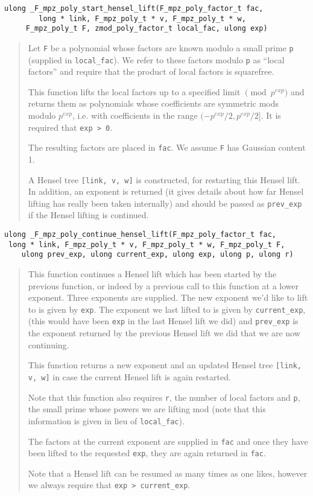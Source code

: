 \documentclass[a4paper,10pt]{article}
\newcommand{\code}{\lstinline}
\begin{document}
\begin{lstlisting}
ulong _F_mpz_poly_start_hensel_lift(F_mpz_poly_factor_t fac, 
        long * link, F_mpz_poly_t * v, F_mpz_poly_t * w, 
     F_mpz_poly_t F, zmod_poly_factor_t local_fac, ulong exp)
\end{lstlisting}
\begin{quote}
Let \code{F} be a polynomial whose factors are known modulo a small prime \code{p} (supplied in 
\code{local_fac}). We refer to these factors modulo \code{p} as ``local factors'' and require that the 
product of local factors is squarefree. 

This function lifts the local factors up to a specified limit $\pmod{p^{exp}}$ and returns them as 
polynomials whose coefficients are symmetric mods modulo $p^{exp}$, i.e. with coefficients in the range 
$(-p^{exp}/2, p^{exp}/2]$. It is required that \code{exp > 0}.

The resulting factors are placed in \code{fac}. We assume \code{F} has Gaussian content 1.

A Hensel tree \code{[link, v, w]} is constructed, for restarting this Hensel lift. In addition, an
exponent is returned (it gives details about how far Hensel lifting has really been taken internally)
and should be passed as \code{prev_exp} if the Hensel lifting is continued.
\end{quote}

\begin{lstlisting}
ulong _F_mpz_poly_continue_hensel_lift(F_mpz_poly_factor_t fac, 
 long * link, F_mpz_poly_t * v, F_mpz_poly_t * w, F_mpz_poly_t F, 
    ulong prev_exp, ulong current_exp, ulong exp, ulong p, ulong r)
\end{lstlisting}
\begin{quote}
This function continues a Hensel lift which has been started by the previous function, or indeed by a
previous call to this function at a lower exponent. Three exponents are supplied. The new exponent we'd
like to lift to is given by \code{exp}. The exponent we last lifted to is given by \code{current_exp},
(this would have been \code{exp} in the last Hensel lift we did) and \code{prev_exp} is the exponent
returned by the previous Hensel lift we did that we are now continuing.

This function returns a new exponent and an updated Hensel tree \code{[link, v, w]} in case the current
Hensel lift is again restarted.

Note that this function also requires \code{r}, the number of local factors and \code{p}, the small 
prime whose powers we are lifting mod (note that this information is given in lieu of \code{local_fac}). 

The factors at the current exponent are supplied in \code{fac} and once they have been lifted to the
requested \code{exp}, they are again returned in \code{fac}.

Note that a Hensel lift can be resumed as many times as one likes, however we always require that
\code{exp > current_exp}.
\end{quote}
\end{document}

